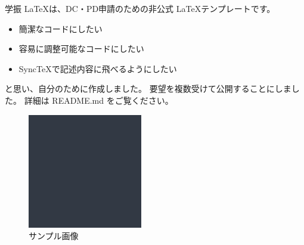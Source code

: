 学振 \LaTeX は、DC・PD申請のための非公式 \LaTeX テンプレートです。
\begin{itemize}
    \setlength\itemsep{-4pt}
    \item 簡潔なコードにしたい
    \item 容易に調整可能なコードにしたい
    \item SyncTeXで記述内容に飛べるようにしたい
\end{itemize}
と思い、自分のために作成しました。
要望を複数受けて公開することにしました。
詳細は README.md をご覧ください。

\begin{figure}
    \centering
    \includegraphics[width=50mm]{figures/sample.pdf}
    \caption{サンプル画像}
    \label{fig:sample}
\end{figure}

\lipsum[1-6]
